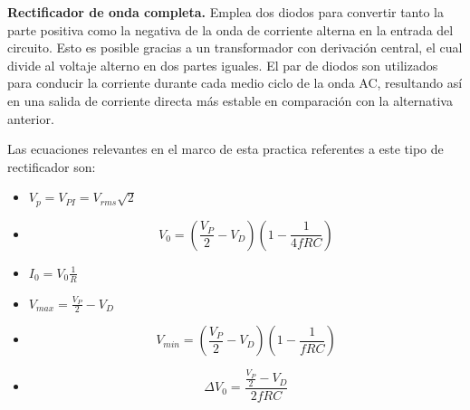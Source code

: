 \documentclass[12pt]{article}
\begin{document}
            \textbf{Rectificador de onda completa.}  Emplea dos diodos para convertir tanto la parte positiva como la negativa de la onda de corriente alterna
            en la entrada del circuito. Esto es posible gracias a un transformador con derivación central, 
            el cual divide al voltaje alterno en dos partes iguales. El par de diodos son utilizados para 
            conducir la corriente durante cada medio ciclo de la onda AC, resultando así en una salida de 
            corriente directa más estable en comparación con la alternativa anterior.\par
            Las ecuaciones relevantes en el marco de esta practica referentes a este tipo de rectificador son:\par
            \begin{multicols}{2}
                \begin{itemize}
                    \item$V_p = V_{PI} = V_{rms}\sqrt{2}$
                    \item \begin{equation*}
                        V_0=(\frac{V_P}{2}-V_D)(1-\frac{1}{4fRC})
                    \end{equation*}
                    \item $I_0 = V_0 \frac{1}{R}$
                    \item $V_{max} = \frac{V_P}{2} - V_D$
                    \item \begin{equation*}
                        V_{min}=(\frac{V_P}{2}-V_D)(1-\frac{1}{fRC})
                    \end{equation*}
                    \item \begin{equation*}
                        \Delta  V_0 = \frac{\frac{V_P}{2}-V_D}{2fRC}
                    \end{equation*}
                \end{itemize}
            \end{multicols}
\end{document}
